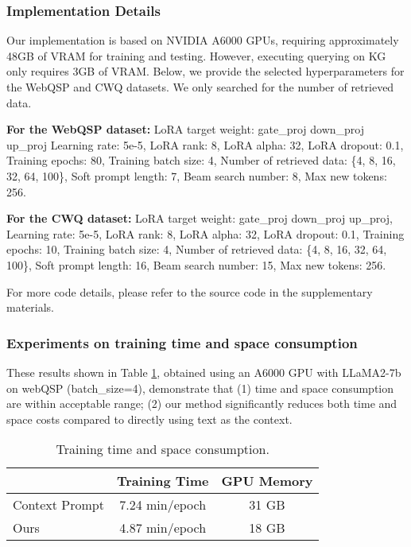 \subsubsection{Implementation Details}
Our implementation is based on NVIDIA A6000 GPUs, requiring approximately 48GB of VRAM for training and testing. However, executing querying on KG only requires 3GB of VRAM. Below, we provide the selected hyperparameters for the WebQSP and CWQ datasets. We only searched for the number of retrieved data.

\textbf{For the WebQSP dataset:}
LoRA target weight: gate\_proj down\_proj up\_proj
Learning rate: 5e-5,
LoRA rank: 8,
LoRA alpha: 32,
LoRA dropout: 0.1,
Training epochs: 80,
Training batch size: 4,
Number of retrieved data: \{4, 8, 16, 32, 64, 100\},
Soft prompt length: 7,
Beam search number: 8,
Max new tokens: 256.

\textbf{For the CWQ dataset:}
LoRA target weight: gate\_proj down\_proj up\_proj,
Learning rate: 5e-5,
LoRA rank: 8,
LoRA alpha: 32,
LoRA dropout: 0.1,
Training epochs: 10,
Training batch size: 4,
Number of retrieved data: \{4, 8, 16, 32, 64, 100\},
Soft prompt length: 16,
Beam search number: 15,
Max new tokens: 256.

For more code details, please refer to the source code in the supplementary materials.



\subsubsection{Experiments on training time and space consumption}
These results shown in Table \ref{tab:time}, obtained using an A6000 GPU with LLaMA2-7b on webQSP (batch\_size=4), demonstrate that (1) time and space consumption are within acceptable range; (2) our method significantly reduces both time and space costs compared to directly using text as the context.

\begin{table}[t]
\setlength\tabcolsep{2pt}  %
\centering
\begin{tabular}{lcc}
\toprule
 & Training Time & GPU Memory  \\
\midrule 
Context Prompt&	7.24 min/epoch	&31 GB \\
Ours	&4.87 min/epoch	&18 GB\\
\bottomrule 
\end{tabular}
\caption{Training time and space consumption.
}
\label{tab:time}
\end{table}
